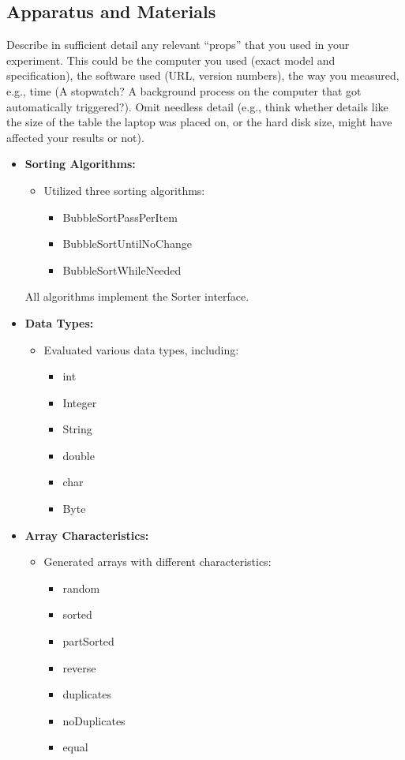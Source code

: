 \documentclass{article}
\begin{document}
\subsection{Apparatus and Materials}
Describe in sufficient detail any relevant “props” that you used in your experiment. This could be the computer you used (exact model and specification), the software used (URL, version numbers), the way you measured, e.g., time (A stopwatch? A background process on the computer that got automatically triggered?). Omit needless detail (e.g., think whether details like the size of the table the laptop was placed on, or the hard disk size, might have affected your results or not).
\begin{itemize}
  \item \textbf{Sorting Algorithms:}
    \begin{itemize}
      \item Utilized three sorting algorithms:
        \begin{itemize}
          \item BubbleSortPassPerItem
          \item BubbleSortUntilNoChange
          \item BubbleSortWhileNeeded
        \end{itemize}
    \end{itemize}
     All algorithms implement the Sorter interface.

  \item \textbf{Data Types:}
    \begin{itemize}
      \item Evaluated various data types, including:
        \begin{itemize}
          \item int
          \item Integer
          \item String
          \item double
          \item char
          \item Byte
        \end{itemize}
    \end{itemize}

  \item \textbf{Array Characteristics:}
    \begin{itemize}
      \item Generated arrays with different characteristics:
        \begin{itemize}
          \item random
          \item sorted
          \item partSorted
          \item reverse
          \item duplicates
          \item noDuplicates
          \item equal
        \end{itemize}
    \end{itemize}


\end{itemize}
\end{document}
